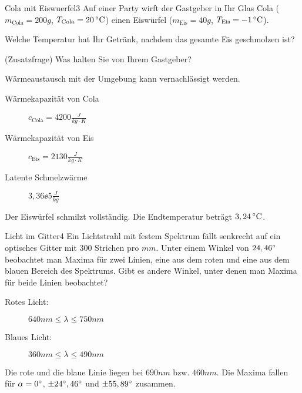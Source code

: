 

\begin{problem}{Cola mit Eiswuerfel}{3}
Auf einer Party wirft der Gastgeber in Ihr Glas Cola ($m_\mathrm{Cola} = 200\unit{g}$, $T_\mathrm{Cola} = 20\,\mathrm{^\circ C}$) einen Eiswürfel ($m_\mathrm{Eis} = 40\unit{g}$, $T_\mathrm{Eis} = -1\,\mathrm{^\circ C}$).
\begin{abcenum}
\item Welche Temperatur hat Ihr Getränk, nachdem das gesamte Eis geschmolzen ist?
\item (Zusatzfrage) Was halten Sie von Ihrem Gastgeber?
\end{abcenum}
Wärmeaustausch mit der Umgebung kann vernachlässigt werden.
\begin{description}
\item[Wärmekapazität von Cola] $c_{\mathrm{Cola}} = 4200\unit{\frac{J}{kg \cdot K}}$
\item[Wärmekapazität von Eis] $c_{\mathrm{Eis}} = 2130\unit{\frac{J}{kg \cdot K}}$
\item[Latente Schmelzwärme] $3,36\ee{5}\unit{\frac{J}{kg}}$
\end{description}

\begin{solution}
Der Eiswürfel schmilzt vollständig. Die Endtemperatur beträgt $3,24\,\mathrm{^\circ C}$.
\end{solution}
\end{problem}


\begin{problem}{Licht im Gitter}{4}
Ein Lichtstrahl mit festem Spektrum fällt senkrecht auf ein optisches Gitter mit $300$ Strichen pro $\unit{mm}$.
Unter einem Winkel von $24,46^\circ$ beobachtet man Maxima für zwei Linien, eine aus dem roten und eine aus dem blauen Bereich des Spektrums.
Gibt es andere Winkel, unter denen man Maxima für beide Linien beobachtet?
\begin{description}
\item[Rotes Licht:] $640\unit{nm}\leq\lambda\leq750\unit{nm}$
\item[Blaues Licht:] $360\unit{nm}\leq\lambda\leq490\unit{nm}$
\end{description}
\begin{solution}
Die rote und die blaue Linie liegen bei $690\unit{nm}$ bzw. $460\unit{nm}$.
Die Maxima fallen für $\alpha=0^\circ$, $\pm24^\circ,46^\circ$ und $\pm55,89^\circ$ zusammen.
\end{solution}
\end{problem}



